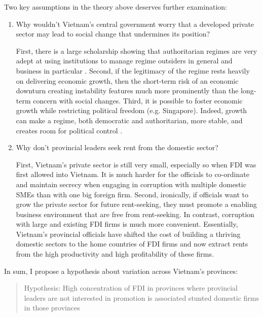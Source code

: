 Two key assumptions in the theory above deserves further examination:
\begin{enumerate}
\item Why wouldn't Vietnam's central government worry that a developed private sector may lead to social change that undermines its position?

First, there is a large scholarship showing that authoritarian regimes are very adept at using institutions to manage regime outsiders in general and business in particular \citep{Gandhi2006, Gandhi2008, Wright2008, Le2015}. Second, if the legitimacy of the regime rests heavily on delivering economic growth, then the short-term risk of an economic downturn creating instability features much more prominently than the long-term concern with social changes. Third, it is possible to foster economic growth while restricting political freedom (e.g. Singapore). Indeed, growth can make a regime, both democratic and authoritarian, more stable, and creates room for political control \citep{Przeworski1997}.

\item Why don't provincial leaders seek rent from the domestic sector? 

First, Vietnam's private sector is still very small, especially so when FDI was first allowed into Vietnam. It is much harder for the officials to co-ordinate and maintain secrecy when engaging in corruption with multiple domestic SMEs than with one big foreign firm. Second, ironically, if officials want to grow the private sector for future rent-seeking, they must promote a enabling business environment that are free from rent-seeking. In contrast, corruption with large and existing FDI firms is much more convenient. Essentially, Vietnam's provincial officials have shifted the cost of building a thriving domestic sectors to the home countries of FDI firms and now extract rents from the high productivity and high profitability of these firms. 

\end{enumerate}


In sum, I propose a hypothesis about variation across Vietnam's provinces:

\begin{quote}
Hypothesis: High concentration of FDI in provinces where provincial leaders are not interested in promotion is associated stunted domestic firms in those provinces
\end{quote}

